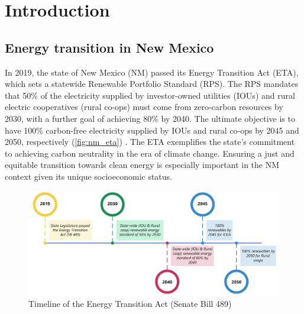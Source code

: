 \documentclass[11pt,twoside,letterpaper]{article}
\begin{document}
\newpage



\tableofcontents
\listoffigures
\listoftables
\newpage

\section{Introduction}

\subsection{Energy transition in New Mexico}


In 2019, the state of New Mexico (NM) passed its Energy Transition Act (ETA), which sets a statewide Renewable Portfolio Standard (RPS). The RPS mandates that 50\% of the electricity supplied by investor-owned utilities (IOUs) and rural electric cooperatives (rural co-ops) must come from zero-carbon resources by 2030, with a further goal of achieving 80\% by 2040. The ultimate objective is to have 100\% carbon-free electricity supplied by IOUs and rural co-ops by 2045 and 2050, respectively (\autoref{fig:nm_eta}) \parencite{nmleg2019}. The ETA exemplifies the state's commitment to achieving carbon neutrality in the era of climate change. Ensuring a just and equitable transition towards clean energy is especially important in the NM context given its unique socioeconomic status.

\begin{figure}[!ht]
    \centering
    \includegraphics[width=1\textwidth]{figures/nm_eta.png}
    \caption{Timeline of the Energy Transition Act (Senate Bill 489)}
    \label{fig:nm_eta}
\end{figure}
\end{document}
